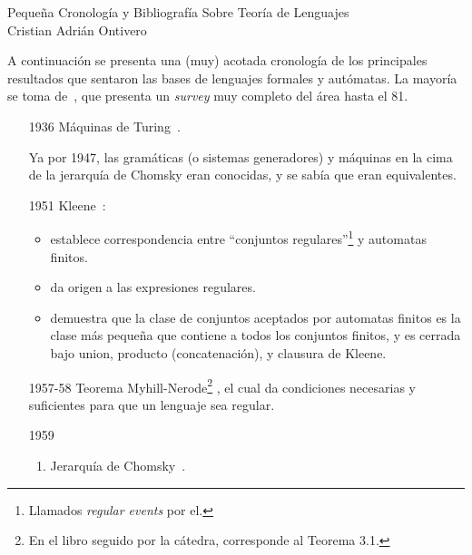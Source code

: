 \documentclass[spanish]{article}
\theoremstyle{definition}
\begin{document}
\begin{center}
  {\LARGE Pequeña Cronología y Bibliografía Sobre Teoría de Lenguajes}\\[.2cm]
  Cristian Adrián Ontivero \\[.05cm]%
  \isodate%
\end{center}

\vspace{0.2 cm}

A continuación se presenta una (muy) acotada cronología de los principales resultados
que sentaron las bases de lenguajes formales y autómatas. La mayoría se toma
de~\cite{Gre81}, que presenta un \textit{survey} muy completo del área hasta el
81. 

\begin{itemize}
  \item[1936] Máquinas de Turing~\cite{Tur36}.

Ya por 1947, las gramáticas (o sistemas generadores) y máquinas en la cima de la
jerarquía de Chomsky eran conocidas, y se sabía que eran equivalentes.

  \item[1951] Kleene~\cite{Kle51}:

\begin{itemize}
\item establece correspondencia entre ``conjuntos regulares''\footnote{Llamados \textit{regular events} por el.} y automatas finitos.
\item da origen a las expresiones regulares.
\item demuestra que la clase de conjuntos aceptados por automatas finitos es la clase más pequeña que contiene a todos los conjuntos finitos, y es cerrada bajo union, producto (concatenación), y clausura de Kleene.
\end{itemize}

  \item [1957-58] Teorema Myhill-Nerode\footnote{En el libro seguido por la
    cátedra, corresponde al Teorema 3.1.} \cite{Nerode58}, el cual da
    condiciones necesarias y suficientes para que un lenguaje sea regular.

  \item[1959] \begin{enumerate}[leftmargin=.5cm, label=\alph*.]
    \item Jerarquía de Chomsky~\cite{Cho59}.


\end{enumerate}
\end{itemize}
\end{document}
